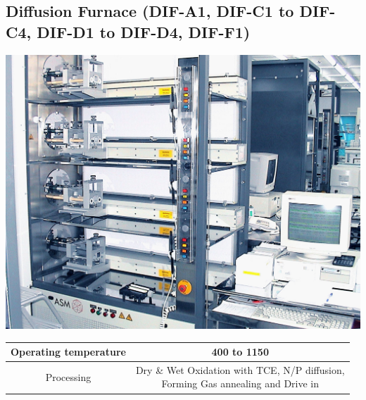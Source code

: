 \subsection{Diffusion Furnace (DIF-A1, DIF-C1 to DIF-C4, DIF-D1 to DIF-D4, DIF-F1)}\label{diffusion_furnace_machine}
\WaferClean\WaferSemiClean\WaferNonStandard

\begin{minipage}[H]{\MachinePictureWidth}
	\includegraphics[width=\MachinePictureWidth]{pictures_machines/diffusion_furnace.png}
\end{minipage}\begin{minipage}[H]{0.5\textwidth}
	\begin{tabular}{|c|c|}
		\hline
		Operating temperature &
		400 to 1150 \degreesC \\
		\hline
		Processing &
		\makecell{Dry \& Wet Oxidation with TCE, N/P diffusion, \\
		Forming Gas annealing and Drive in} \\
		\hline
	\end{tabular}
\end{minipage}